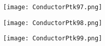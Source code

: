 \documentclass[pdf]{beamer}
\begin{document}
\begin{frame}
\begin{figure}[!h]
\centering
\texttt{[image: ConductorPtk97.png]}
\end{figure}
\end{frame}

\begin{frame}
\begin{figure}[!h]
\centering
\texttt{[image: ConductorPtk98.png]}
\end{figure}
\end{frame}

\begin{frame}
\begin{figure}[!h]
\centering
\texttt{[image: ConductorPtk99.png]}
\end{figure}
\end{frame}
\end{document}
